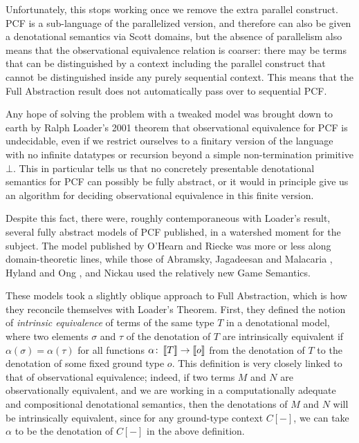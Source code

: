 Unfortunately, this stops working once we remove the extra parallel construct.
PCF is a sub-language of the parallelized version, and therefore can also be given a denotational semantics via Scott domains, but the absence of parallelism also means that the observational equivalence relation is coarser: there may be terms that can be distinguished by a context including the parallel construct that cannot be distinguished inside any purely sequential context.  
This means that the Full Abstraction result does not automatically pass over to sequential PCF.

Any hope of solving the problem with a tweaked model was brought down to earth by Ralph Loader's 2001 theorem that observational equivalence for PCF is undecidable, even if we restrict ourselves to a finitary version of the language with no infinite datatypes or recursion beyond a simple non-termination primitive $\bot$.
This in particular tells us that no concretely presentable denotational semantics for PCF can possibly be fully abstract, or it would in principle give us an algorithm for deciding observational equivalence in this finite version.

Despite this fact, there were, roughly contemporaneous with Loader's result, several fully abstract models of PCF published, in a watershed moment for the subject.
The model published by O'Hearn and Riecke \cite{OHearnRieckePcf} was more or less along domain-theoretic lines, while those of Abramsky, Jagadeesan and Malacaria \cite{ajmPcf}, Hyland and Ong \cite{hoPcf}, and Nickau \cite{NickauPcf} used the relatively new Game Semantics.

These models took a slightly oblique approach to Full Abstraction, which is how they reconcile themselves with Loader's Theorem.
First, they defined the notion of \emph{intrinsic equivalence} of terms of the same type $T$ in a denotational model, where two elements $\sigma$ and $\tau$ of the denotation of $T$ are intrinsically equivalent if $\alpha(\sigma)=\alpha(\tau)$ for all functions $\alpha\colon\left\llbracket T\right\rrbracket\to\left\llbracket o\right\rrbracket$ from the denotation of $T$ to the denotation of some fixed ground type $o$.
This definition is very closely linked to that of observational equivalence; indeed, if two terms $M$ and $N$ are observationally equivalent, and we are working in a computationally adequate and compositional denotational semantics, then the denotations of $M$ and $N$ will be intrinsically equivalent, since for any ground-type context $C[-]$, we can take $\alpha$ to be the denotation of $C[-]$ in the above definition.

